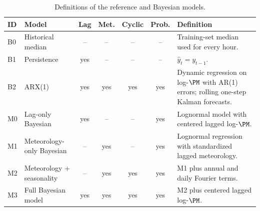 \begin{table}[H]
\caption{Definitions of the reference and Bayesian models.\label{tab:model-definitions}}
\centering
\scriptsize
\begin{tabularx}{\textwidth}{l l c c c c X}
\toprule
\textbf{ID} & \textbf{Model} & \textbf{Lag} & \textbf{Met.} & \textbf{Cyclic} & \textbf{Prob.} & \textbf{Definition}\\
\midrule
B0 & Historical median & -- & -- & -- & -- & Training-set median used for every hour.\\
B1 & Persistence & yes & -- & -- & -- & $\widehat y_t=y_{t-1}$.\\
B2 & {ARX(1)} & yes & yes & yes & yes & {Dynamic regression on log-$\PM$ with AR(1) errors; rolling one-step Kalman forecasts.}\\
M0 & Lag-only Bayesian & yes & -- & -- & yes & Lognormal model with centered lagged log-$\PM$.\\
M1 & Meteorology-only Bayesian & -- & yes & -- & yes & Lognormal regression with standardized lagged meteorology.\\
M2 & Meteorology + seasonality & -- & yes & yes & yes & M1 plus annual and daily Fourier terms.\\
M3 & Full Bayesian model & yes & yes & yes & yes & M2 plus centered lagged log-$\PM$.\\
\bottomrule
\end{tabularx}
\end{table}
